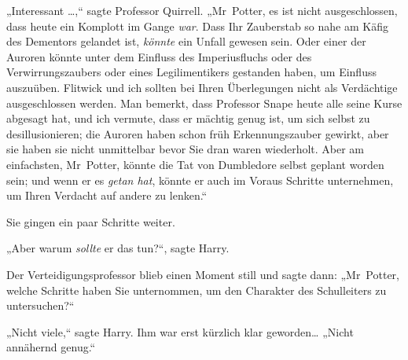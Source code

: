 „Interessant …,“ sagte Professor Quirrell. „Mr~Potter, es ist nicht ausgeschlossen, dass heute ein Komplott im Gange \emph{war}. Dass Ihr Zauberstab so nahe am Käfig des Dementors gelandet ist, \emph{könnte} ein Unfall gewesen sein. Oder einer der Auroren könnte unter dem Einfluss des Imperiusfluchs oder des Verwirrungszaubers oder eines Legilimentikers gestanden haben, um Einfluss auszuüben. Flitwick und ich sollten bei Ihren Überlegungen nicht als Verdächtige ausgeschlossen werden. Man bemerkt, dass Professor Snape heute alle seine Kurse abgesagt hat, und ich vermute, dass er mächtig genug ist, um sich selbst zu desillusionieren; die Auroren haben schon früh Erkennungszauber gewirkt, aber sie haben sie nicht unmittelbar bevor Sie dran waren wiederholt. Aber am einfachsten, Mr~Potter, könnte die Tat von Dumbledore selbst geplant worden sein; und wenn er es \emph{getan hat}, könnte er auch im Voraus Schritte unternehmen, um Ihren Verdacht auf andere zu lenken.“

Sie gingen ein paar Schritte weiter.

„Aber warum \emph{sollte} er das tun?“, sagte Harry.

Der Verteidigungsprofessor blieb einen Moment still und sagte dann: „Mr~Potter, welche Schritte haben Sie unternommen, um den Charakter des Schulleiters zu untersuchen?“

„Nicht viele,“ sagte Harry. Ihm war erst kürzlich klar geworden… „Nicht annähernd genug.“

